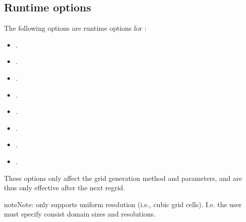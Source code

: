\documentclass[letterpaper,10pt,english]{sphinxmanual}
\begin{document}
\subsection{Runtime options}
\label{\detokenize{Source/AmrMesh:runtime-options}}
The following options are runtime options for :
\begin{itemize}
\item {} 
.

\item {} 
.

\item {} 
.

\item {} 
.

\item {} 
.

\item {} 
.

\item {} 
.

\item {} 
.

\end{itemize}

These options only affect the grid generation method and parameters, and are thus only effective after the next regrid.

\begin{sphinxadmonition}{note}{Note:}
 only supports uniform resolution (i.e., cubic grid cells).
I.e. the user must specify consist domain sizes and resolutions.
\end{sphinxadmonition}
\end{document}
